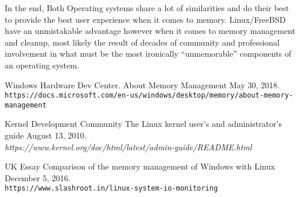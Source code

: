 \documentclass[onecolumn, draftclsnofoot,10pt, compsoc]{IEEEtran}
\begin{document}
In the end, Both Operating systems share a lot of similarities and do their best to provide the best user experience when it comes to memory. Linux/FreeBSD have an unmistakable advantage however when it comes to memory management and cleanup, most likely the result of decades of community and professional involvement in what must be the most ironically “unmemorable” components of an operating system.

	
\newpage
\begin{thebibliography}{10}
	Windows Hardware Dev Center.
	About Memory Management
	May 30, 2018.
	\\\texttt{https://docs.microsoft.com/en-us/windows/desktop/memory/about-memory-management}

	Kernel Development Community
	The Linux kernel user’s and administrator’s guide
	August 13, 2010.
	\\\textit{https://www.kernel.org/doc/html/latest/admin-guide/README.html}

    UK Essay
	Comparison of the memory management of Windows with Linux
	December 5, 2016.
	\\\texttt{https://www.slashroot.in/linux-system-io-monitoring}

	
	

















\end{thebibliography}
\end{document}
